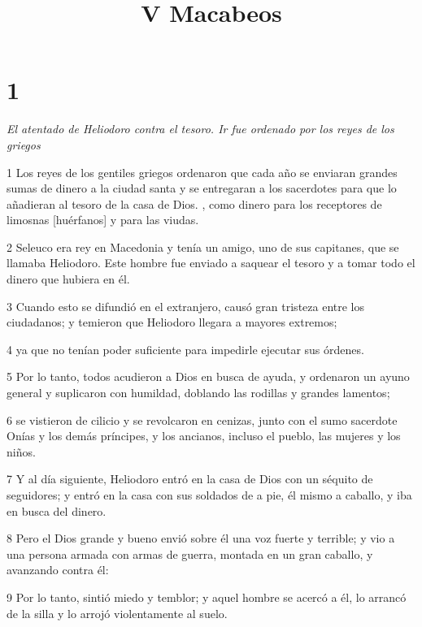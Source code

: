 

\title{V Macabeos}


\chapter{1}

\par \textit{El atentado de Heliodoro contra el tesoro. Ir fue ordenado por los reyes de los griegos}

\par 1 Los reyes de los gentiles griegos ordenaron que cada año se enviaran grandes sumas de dinero a la ciudad santa y se entregaran a los sacerdotes para que lo añadieran al tesoro de la casa de Dios. , como dinero para los receptores de limosnas [huérfanos] y para las viudas.

\par 2 Seleuco era rey en Macedonia y tenía un amigo, uno de sus capitanes, que se llamaba Heliodoro. Este hombre fue enviado a saquear el tesoro y a tomar todo el dinero que hubiera en él.

\par 3 Cuando esto se difundió en el extranjero, causó gran tristeza entre los ciudadanos; y temieron que Heliodoro llegara a mayores extremos;

\par 4 ya que no tenían poder suficiente para impedirle ejecutar sus órdenes.

\par 5 Por lo tanto, todos acudieron a Dios en busca de ayuda, y ordenaron un ayuno general y suplicaron con humildad, doblando las rodillas y grandes lamentos;

\par 6 se vistieron de cilicio y se revolcaron en cenizas, junto con el sumo sacerdote Onías y los demás príncipes, y los ancianos, incluso el pueblo, las mujeres y los niños.

\par 7 Y al día siguiente, Heliodoro entró en la casa de Dios con un séquito de seguidores; y entró en la casa con sus soldados de a pie, él mismo a caballo, y iba en busca del dinero.

\par 8 Pero el Dios grande y bueno envió sobre él una voz fuerte y terrible; y vio a una persona armada con armas de guerra, montada en un gran caballo, y avanzando contra él:

\par 9 Por lo tanto, sintió miedo y temblor; y aquel hombre se acercó a él, lo arrancó de la silla y lo arrojó violentamente al suelo.

